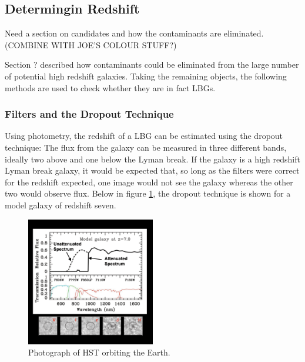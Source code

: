 
\subsection{Determingin Redshift} %
	\label{sub:determingin_redshift}
	Need a section on candidates and how the contaminants are eliminated.
	(COMBINE WITH JOE’S COLOUR STUFF?)

	Section ? described how contaminants could be eliminated from the large number of potential high redshift galaxies. Taking the remaining objects, the following methods are used to check whether they are in fact LBGs.

	\subsubsection{Filters and the Dropout Technique} %
		\label{ssub:filters_and_the_dropout_technique}
		Using photometry, the redshift of a LBG can be estimated using the dropout technique: The flux from the galaxy can be measured in three different bands, ideally two above and one below the Lyman break. If the galaxy is a high redshift Lyman break galaxy, it would be expected that, so long as the filters were correct for the redshift expected, one image would not see the galaxy whereas the other two would observe flux. Below in figure \ref{fig:drop_out_at_z7}, the dropout technique is shown for a model galaxy of redshift seven.
		\begin{figure}[ht]
			\centering
			\includegraphics[width=0.5\textwidth]{../Images/drop_out_at_z7.gif}
			\caption{Photograph of HST orbiting the Earth.\cite{first_galaxies_dropout_at_z7}\label{fig:drop_out_at_z7}}
		\end{figure}


